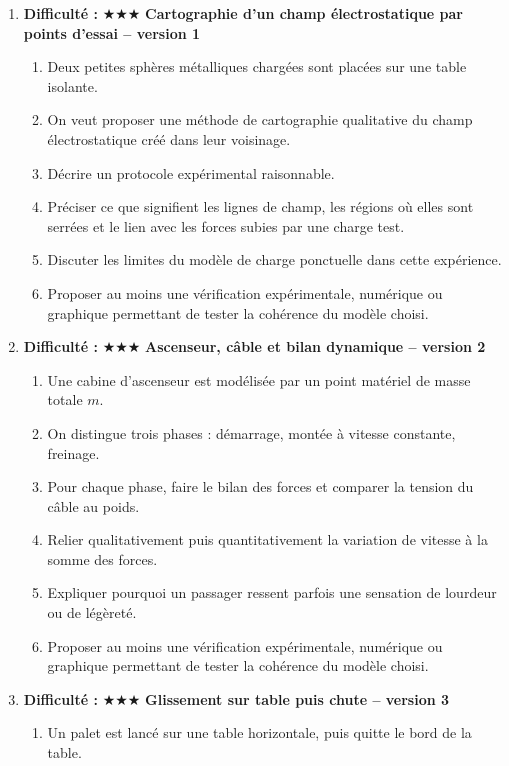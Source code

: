 \documentclass[11pt,a4paper]{article}
\newcommand{\etoiles}[1]{\textbf{Difficulté : }#1}
\begin{document}
\begin{enumerate}[label=\textbf{Problème long \arabic*.},leftmargin=*]
\item \etoiles{★★★}
\textbf{Cartographie d'un champ électrostatique par points d'essai -- version 1}
\begin{enumerate}[label=\alph*)]
\item Deux petites sphères métalliques chargées sont placées sur une table isolante.
\item On veut proposer une méthode de cartographie qualitative du champ électrostatique créé dans leur voisinage.
\item Décrire un protocole expérimental raisonnable.
\item Préciser ce que signifient les lignes de champ, les régions où elles sont serrées et le lien avec les forces subies par une charge test.
\item Discuter les limites du modèle de charge ponctuelle dans cette expérience.
\item Proposer au moins une vérification expérimentale, numérique ou graphique permettant de tester la cohérence du modèle choisi.
\end{enumerate}
\item \etoiles{★★★}
\textbf{Ascenseur, câble et bilan dynamique -- version 2}
\begin{enumerate}[label=\alph*)]
\item Une cabine d'ascenseur est modélisée par un point matériel de masse totale $m$.
\item On distingue trois phases : démarrage, montée à vitesse constante, freinage.
\item Pour chaque phase, faire le bilan des forces et comparer la tension du câble au poids.
\item Relier qualitativement puis quantitativement la variation de vitesse à la somme des forces.
\item Expliquer pourquoi un passager ressent parfois une sensation de lourdeur ou de légèreté.
\item Proposer au moins une vérification expérimentale, numérique ou graphique permettant de tester la cohérence du modèle choisi.
\end{enumerate}
\item \etoiles{★★★}
\textbf{Glissement sur table puis chute -- version 3}
\begin{enumerate}[label=\alph*)]
\item Un palet est lancé sur une table horizontale, puis quitte le bord de la table.

\end{enumerate}
\end{enumerate}
\end{document}
